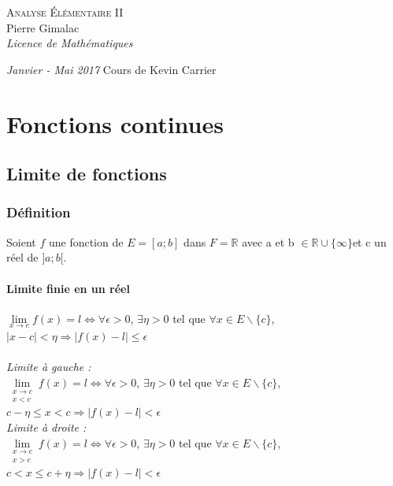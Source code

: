 \documentclass[a4paper,10pt]{book} %
\newcommand{\R}{\mathbb{R}}
\begin{document}
\begin{titlepage}
\thispagestyle{empty}
\begin{center}
\vspace*{7cm}
\Huge \textsc{Analyse Élémentaire II}\\
\vspace{1.5cm}
\Large Pierre Gimalac\\
\vspace{0.5cm}
\large \textit{Licence de Mathématiques}
\vfill
\end{center}
\large \textit{Janvier - Mai 2017}
\hfill 
\large Cours de Kevin Carrier
\restoregeometry
\end{titlepage}

\renewcommand{\contentsname}{Sommaire}
\thispagestyle{empty}
\tableofcontents
\thispagestyle{empty}
\chapter{Fonctions continues}
\section{Limite de fonctions}
\subsection{Définition}
Soient $f$ une fonction de $E=[a;b]$ dans $F=\R$ avec a et b $\in \R\cup\{\infty\}$et c un réel de $]a;b[$.

\subsubsection{Limite finie en un réel}
$\lim\limits_{x\rightarrow c} f(x)=l \Leftrightarrow \forall \epsilon >0$, $\exists \eta>0$ tel que $\forall x\in E\backslash\{c\}$, $|x-c|<\eta \Rightarrow |f(x)-l|\leq \epsilon$\\\\

\textit{Limite à gauche :}\\
$\lim\limits_{\substack{x\rightarrow c \\ x<c}} f(x)=l \Leftrightarrow \forall \epsilon>0$, $\exists \eta>0$ tel que $\forall x\in E\backslash\{c\}$, $c-\eta\leq x<c \Rightarrow |f(x)-l|<\epsilon$\\

\textit{Limite à droite :}\\
$\lim\limits_{\substack{x\rightarrow c \\ x>c}} f(x)=l \Leftrightarrow \forall \epsilon>0$, $\exists \eta>0$ tel que $\forall x\in E\backslash\{c\}$, $c<x\leq c+\eta \Rightarrow |f(x)-l|<\epsilon$\\
\end{document}
